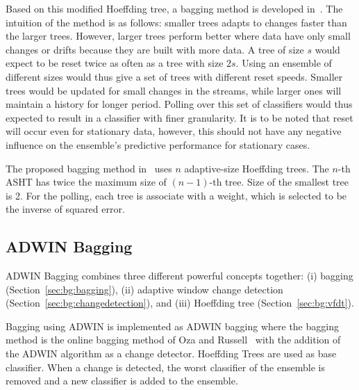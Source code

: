 Based on this modified Hoeffding tree, a bagging method is developed in~\cite{bifet09:asht}. The intuition of the method is as follows: smaller trees adapts to changes faster than the larger trees. However, larger trees perform better where data have only small changes or drifts because  they are built with more data. A tree of size $s$ would expect to be reset twice as often as a tree with size $2s$. Using an ensemble of different sizes would thus give a set of trees with different reset speeds. Smaller trees would be updated for small changes in the streams, while larger ones will maintain a history for longer period. Polling over this set of classifiers would thus expected to result in a classifier with finer granularity. It is to be noted that reset will occur even for stationary data, however, this should not have any negative influence on the ensemble's predictive performance for stationary cases.

The proposed bagging method in~\cite{bifet09:asht} uses $n$ adaptive-size Hoeffding trees. The $n$-th ASHT has twice the maximum size of $(n-1)$-th tree. Size of the smallest tree is 2. For the polling, each tree is associate with a weight, which is selected to be the inverse of squared error.

\subsection{ADWIN Bagging}
ADWIN Bagging combines three different powerful concepts together: (i) bagging (Section~\ref{sec:bg:bagging}), (ii) adaptive window change detection (Section~\ref{sec:bg:changedetection}), and (iii) Hoeffding tree (Section~\ref{sec:bg:vfdt}).

Bagging using ADWIN is implemented as ADWIN bagging where the bagging method is the online bagging method of Oza and Russell~\cite{oza01:obagboost} with the addition of the ADWIN algorithm as a change detector. Hoeffding Trees are used as base classifier. When a change is detected, the worst classifier of the ensemble  is removed and a new classifier is added to the ensemble. 
